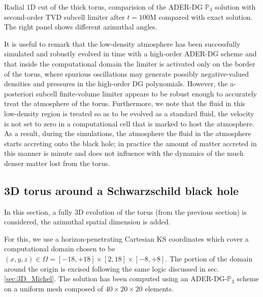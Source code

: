 \begin{marginfigure}
	\caption[
	Radial tori plots 
	]{Radial 1D cut of the thick torus, comparision of the ADER-DG 
		$\mathbb{P}_3$ solution with second-order TVD subcell limiter
		after $t=100$M compared with exact solution. The right panel
		shows different azimuthal angles.}
	\label{fig:Torus.cut}
\end{marginfigure}

It is useful to remark that the low-density atmosphere has been
successfully simulated and robustly evolved in time with a high-order
ADER-DG scheme and that inside the computational domain the limiter is 
activated only on the border of the torus, where 
spurious oscillations may generate possibly negative-valued densities and
pressures in the high-order DG polynomials. However, the {a-posteriori}
subcell finite-volume limiter appears to be robust enough to accurately
treat the atmosphere of the torus. Furthermore, we note that the fluid in
this low-density region is treated so as to be evolved as a standard
fluid, \ie the velocity is not set to zero in a computational cell that
is marked to host the atmosphere. As a result, during the simulations,
the atmosphere the fluid in the atmosphere starts accreting onto the
black hole; in practice the amount of matter accreted in this manner is
minute and does not influence with the dynamics of the much denser matter
lost from the torus.


\subsection{3D torus around a Schwarzschild black hole}\label{sec:3d-torus-gr}
In this section, a fully 3D evolution of the torus (from the previous
section) is considered, \ie the azimuthal spatial dimension is added.

For this, we use a horizon-penetrating Cartesian KS coordinates which
cover a computational domain chosen to be $(x,y,z) \in \Omega = [-18,+18]
\times [2,18]\times[-8,+8]$. The portion of the domain around the origin
is excised following the same logic discussed in sec. \ref{sec:3D_Michel}.
 The solution has been computed using an
ADER-DG-$\mathbb{P}_3$ scheme on a uniform mesh composed of
$40\times20\times20$ elements.  

